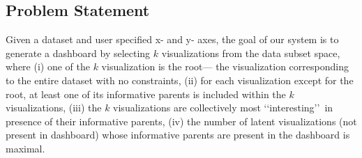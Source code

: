 \subsection{Problem Statement}

Given a dataset and user specified x- and y- axes, the goal of our system is to generate a dashboard by selecting $k$ visualizations from the data subset space, where (i) one of the $k$ visualization is the root--- the visualization corresponding to the entire dataset with no constraints, (ii) for each visualization except for the root, at least one of its informative parents is included within the $k$ visualizations, (iii) the $k$ visualizations are collectively most \lq\lq interesting\rq\rq\ in presence of their informative parents, (iv) the number of latent visualizations (not present in dashboard) whose informative parents are present in the dashboard is maximal.

